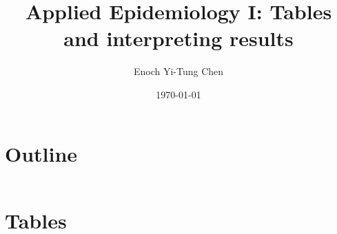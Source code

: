 

\title[Applied Epi I: Interpreting results]{Applied Epidemiology I: Tables and interpreting results}
\date{\today}
\author[Enoch Yi-Tung Chen]{Enoch Yi-Tung Chen}




\begin{frame}
\maketitle 
\end{frame}



\section*{Outline}
\begin{frame}{\secname}
 \begin{columns}[t]
        \begin{column}{.5\textwidth}
            \tableofcontents[sections={1-4}]
        \end{column}
        \begin{column}{.5\textwidth}
            \tableofcontents[sections={5-7}]
        \end{column}
\end{columns}
\end{frame}
\section{Tables}
